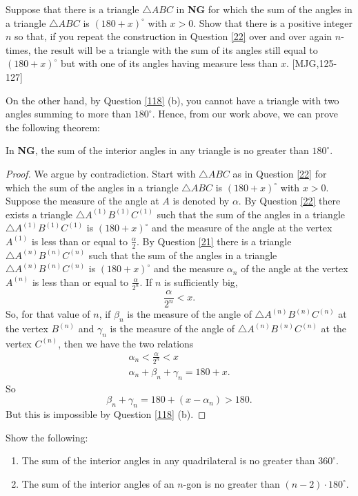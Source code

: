 \documentclass{ximera}
\begin{document}
\begin{question}
\label{121} Suppose that there is a triangle $\triangle ABC$ in
\textbf{NG} for which the sum of the angles in a triangle $\triangle ABC$ is
$\left( 180+x\right)^\circ$ with $x>0$. Show that there is a positive
integer $n$ so that, if you repeat the construction in
Question \ref{22} over and over again $n$-times, the result will be a
triangle with the sum of its angles still equal to $\left(
180+x\right)^\circ$ but with one of its angles having measure less
than $x$. [MJG,125-127]
\end{question}


On the other hand, by Question \ref{118} (b), you cannot have a
triangle with two angles summing to more than $180^\circ$. Hence, from
our work above, we can prove the following theorem:

\begin{theorem}
In \textbf{NG}, the sum of the interior angles in any triangle is no greater
than $180^\circ$.
\end{theorem}

\begin{proof}
We argue by contradiction. Start with $\triangle ABC$ as in Question \ref{22}
for which the sum of the angles in a triangle $\triangle ABC$ is $\left(
180+x\right)^\circ$ with $x>0$. Suppose the measure of the angle at $A$ is denoted by $\alpha$.
By Question \ref{22} there exists a triangle $\triangle A^{\left(  1\right)
}B^{\left(  1\right)  }C^{\left(  1\right)  }$ such that the sum of the angles
in a triangle $\triangle A^{\left(  1\right)  }B^{\left(  1\right)
}C^{\left(  1\right)  }$ is $\left(  180+x\right)^\circ$ and the measure of the angle at the vertex $A^{\left(  1\right)  }$ is less
than or equal to $\frac{\alpha}{2}$. By Question \ref{21} there is a triangle
$\triangle A^{\left(  n\right)  }B^{\left(  n\right)  }C^{\left(  n\right)  }$
such that the sum of the angles in a triangle $\triangle A^{\left(  n\right)
}B^{\left(  n\right)  }C^{\left(  n\right)  }$ is $\left(  180+x\right)^\circ$ and the measure $\alpha_{n}$ of the angle at the vertex $A^{\left(
n\right)  }$ is less than or equal to $\frac{\alpha}{2^{n}}$. If $n$ is
sufficiently big,%
\[
\frac{\alpha}{2^{n}}<x.
\]
So, for that value of $n$, if $\beta_{n}$ is the measure of the angle of
$\triangle A^{\left(  n\right)  }B^{\left(  n\right)  }C^{\left(  n\right)  }$
at the vertex $B^{\left(  n\right)  }$ and $\gamma_{n}$ is the measure of the
angle of $\triangle A^{\left(  n\right)  }B^{\left(  n\right)  }C^{\left(
n\right)  }$ at the vertex $C^{\left(  n\right)  }$, then we have the two
relations%
\begin{gather*}
\alpha_{n}<\frac{\alpha}{2^{n}}<x\\
\alpha_{n}+\beta_{n}+\gamma_{n}=180+x.
\end{gather*}
So%
\[
\beta_{n}+\gamma_{n}=180+\left(  x-\alpha_{n}\right)  >180.
\]
But this is impossible by Question \ref{118} (b).
\end{proof}

\begin{question}
Show the following:
\begin{enumerate}
\item The sum of the interior angles in any quadrilateral is no greater than $360^\circ$.
\item The sum of the interior angles of an $n$-gon is no greater than
$\left( n-2\right)\cdot180^\circ$.
\end{enumerate}
\end{question}
\end{document}
